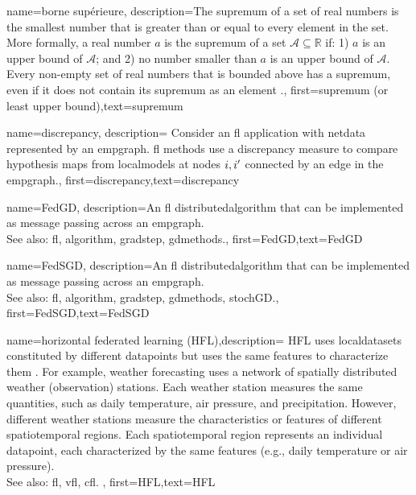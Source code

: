 {name=borne supérieure,
	description={The supremum of a set of real numbers is 
		the smallest number that is greater than or equal to every element in the set. More formally, a 
		real number $a$ is the supremum of a set $\mathcal{A} \subseteq \mathbb{R}$ if: 1) $a$ 
		is an upper bound of $\mathcal{A}$; and 2) no number smaller than $a$ is an upper bound of $\mathcal{A}$. 
		Every non-empty set of real numbers that is bounded above has a supremum, even if it does 
		not contain its supremum as an element \cite[Sec.~1.4]{RudinBookPrinciplesMatheAnalysis}.},
	first={supremum (or least upper bound)},text={supremum}
}

{name=discrepancy,
	description={
		Consider an \gls{fl} application with \gls{netdata} 
		represented by an \gls{empgraph}. \gls{fl} methods use a discrepancy measure 
		to compare \gls{hypothesis} maps from \gls{localmodel}s at nodes $i,i'$ 
		connected by an edge in the \gls{empgraph}.},
	first={discrepancy},text={discrepancy}
}

{name={FedGD},
	description={An \gls{fl} \gls{distributedalgorithm} that 
		can be implemented as message passing across an \gls{empgraph}. 
		\\ 
		See also: \gls{fl}, \gls{algorithm}, \gls{gradstep}, \gls{gdmethods}.},
	first={FedGD},text={FedGD}
} 

{name={FedSGD},
	description={An \gls{fl} \gls{distributedalgorithm} that 
		can be implemented as message passing across an \gls{empgraph}. 
		\\ 
		See also: \gls{fl}, \gls{algorithm}, \gls{gradstep}, \gls{gdmethods}, \gls{stochGD}.},
	first={FedSGD},text={FedSGD}
} 

{name={horizontal federated learning (HFL)},description=
	{HFL uses \gls{localdataset}s constituted by different
		\gls{datapoint}s but uses the same \gls{feature}s to characterize them \cite{HFLChapter2020}.
		For example, weather forecasting uses a network of spatially distributed
		weather (observation) stations. Each weather station measures the
		same quantities, such as daily temperature, air pressure, and precipitation.
		However, different weather stations measure the characteristics or
		\gls{feature}s of different spatiotemporal regions. Each spatiotemporal region 
		represents an individual \gls{datapoint}, each characterized by the same \gls{feature}s 
		(e.g., daily temperature or air pressure).\\
		See also: \gls{fl}, \gls{vfl}, \gls{cfl}. },
	first={HFL},text={HFL}
} 

